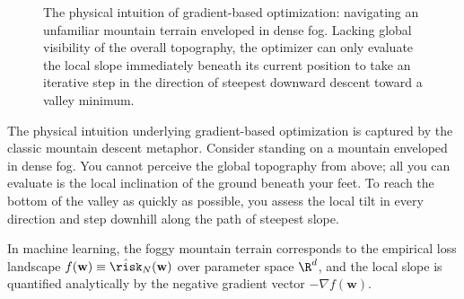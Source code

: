 \begin{figure}[htbp]
\caption{The physical intuition of gradient-based optimization: navigating an unfamiliar mountain terrain enveloped in dense fog. Lacking global visibility of the overall topography, the optimizer can only evaluate the local slope immediately beneath its current position to take an iterative step in the direction of steepest downward descent toward a valley minimum.}
\label{fig:slide_gd_ski}
\end{figure}

The physical intuition underlying gradient-based optimization is captured by the classic mountain descent metaphor. Consider standing on a mountain enveloped in dense fog. You cannot perceive the global topography from above; all you can evaluate is the local inclination of the ground beneath your feet. To reach the bottom of the valley as quickly as possible, you assess the local tilt in every direction and step downhill along the path of steepest slope. 

In machine learning, the foggy mountain terrain corresponds to the empirical loss landscape $f(\mathbf{w}) \equiv \hat{\risk}_N(\mathbf{w})$ over parameter space $\R^d$, and the local slope is quantified analytically by the negative gradient vector $-\nabla f(\mathbf{w})$.

